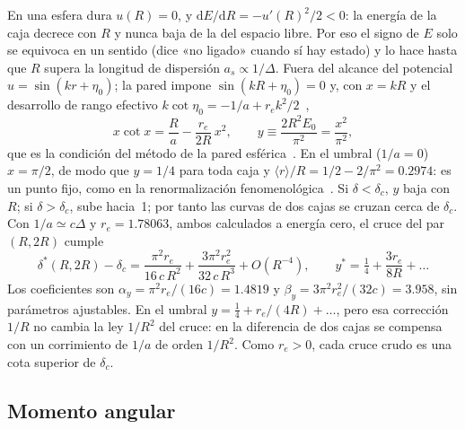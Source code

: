 \documentclass[10pt,letterpaper]{article}
\newcommand{\dc}{\delta_c}
\newcommand{\mr}{\langle r\rangle}
\newcommand{\dd}{\mathrm{d}}
\begin{document}
En una esfera dura $u(R)=0$, y $\dd E/\dd R=-u'(R)^2/2<0$: la energía de la caja decrece con $R$ y nunca baja de la del espacio libre. Por eso el signo de $E$ solo se equivoca en un sentido (dice «no ligado» cuando sí hay estado) y lo hace hasta que $R$ supera la longitud de dispersión $a_s\propto1/\Delta$. Fuera del alcance del potencial $u=\sin(kr+\eta_0)$; la pared impone $\sin(kR+\eta_0)=0$ y, con $x=kR$ y el desarrollo de rango efectivo $k\cot\eta_0=-1/a+r_ek^2/2$~\cite{Bethe1949},
\begin{equation}
x\cot x=\frac Ra-\frac{r_e}{2R}\,x^2,\qquad y\equiv\frac{2R^2E_0}{\pi^2}=\frac{x^2}{\pi^2},\label{eq:caja}
\end{equation}
que es la condición del método de la pared esférica~\cite{Borasoy2007}. En el umbral ($1/a=0$) $x=\pi/2$, de modo que $y=1/4$ para toda caja y $\mr/R=1/2-2/\pi^2=0.2974$: es un punto fijo, como en la renormalización fenomenológica~\cite{Nightingale1976}. Si $\delta<\dc$, $y$ baja con $R$; si $\delta>\dc$, sube hacia~1; por tanto las curvas de dos cajas se cruzan cerca de $\dc$. Con $1/a\simeq c\Delta$ y $r_e=1.78063$, ambos calculados a energía cero, el cruce del par $(R,2R)$ cumple
\begin{equation}
\delta^*(R,2R)-\dc=\frac{\pi^2r_e}{16\,c\,R^2}+\frac{3\pi^2r_e^2}{32\,c\,R^3}+O(R^{-4}),\qquad y^*=\tfrac14+\frac{3r_e}{8R}+\dots\label{eq:ley}
\end{equation}
Los coeficientes son $\alpha_y=\pi^2r_e/(16c)=1.4819$ y $\beta_y=3\pi^2r_e^2/(32c)=3.958$, sin parámetros ajustables. En el umbral $y=\tfrac14+r_e/(4R)+\dots$, pero esa corrección $1/R$ no cambia la ley $1/R^2$ del cruce: en la diferencia de dos cajas se compensa con un corrimiento de $1/a$ de orden $1/R^2$. Como $r_e>0$, cada cruce crudo es una cota superior de $\dc$.

\subsection{Momento angular}
\end{document}
